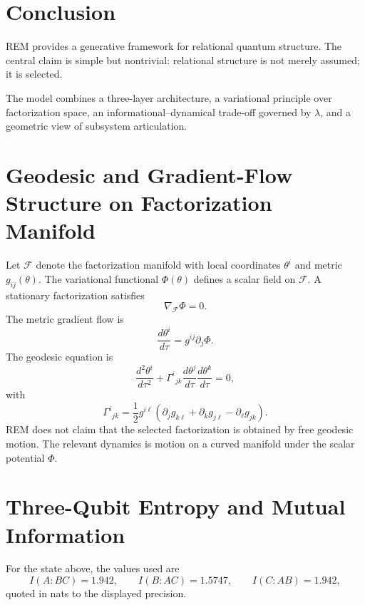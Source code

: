 \documentclass[11pt]{article}
\begin{document}
\section{Conclusion}
REM provides a generative framework for relational quantum structure. The central claim is simple but nontrivial: relational structure is not merely assumed; it is selected.

The model combines a three-layer architecture, a variational principle over factorization space, an informational--dynamical trade-off governed by $\lambda$, and a geometric view of subsystem articulation.

\appendix
\section{Geodesic and Gradient-Flow Structure on Factorization Manifold}
Let $\mathcal{F}$ denote the factorization manifold with local coordinates $\theta^i$ and metric $g_{ij}(\theta)$. The variational functional $\Phi(\theta)$ defines a scalar field on $\mathcal{F}$. A stationary factorization satisfies
\[
\nabla_{\mathcal{F}}\Phi=0.
\]
The metric gradient flow is
\[
\frac{d\theta^i}{d\tau}=g^{ij}\partial_j\Phi.
\]
The geodesic equation is
\[
\frac{d^2\theta^i}{d\tau^2}+\Gamma^{i}{}_{jk}\frac{d\theta^j}{d\tau}\frac{d\theta^k}{d\tau}=0,
\]
with
\[
\Gamma^{i}{}_{jk}=\frac{1}{2}g^{i\ell}(\partial_j g_{k\ell}+\partial_k g_{j\ell}-\partial_\ell g_{jk}).
\]
REM does not claim that the selected factorization is obtained by free geodesic motion. The relevant dynamics is motion on a curved manifold under the scalar potential $\Phi$.

\section{Three-Qubit Entropy and Mutual Information}
For the state above, the values used are
\[
I(A:BC)=1.942,\qquad I(B:AC)=1.5747,\qquad I(C:AB)=1.942,
\]
quoted in nats to the displayed precision.
\end{document}

